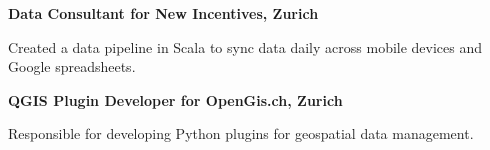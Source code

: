 \documentclass[10pt]{article} %
\begin{document}
\begin{minipage}[t]{0.5\textwidth}
{\raggedright\large \textbf{Data Consultant for New Incentives, Zurich}\\
}

\normalsize{Created a data pipeline in Scala to sync data daily across mobile devices and Google spreadsheets.}\\
{\raggedright\large \textbf{QGIS Plugin Developer for OpenGis.ch, Zurich}\\
}

\normalsize{Responsible for developing Python plugins for geospatial data management.}\\










	

\end{minipage} %
\hfill
\end{document}
